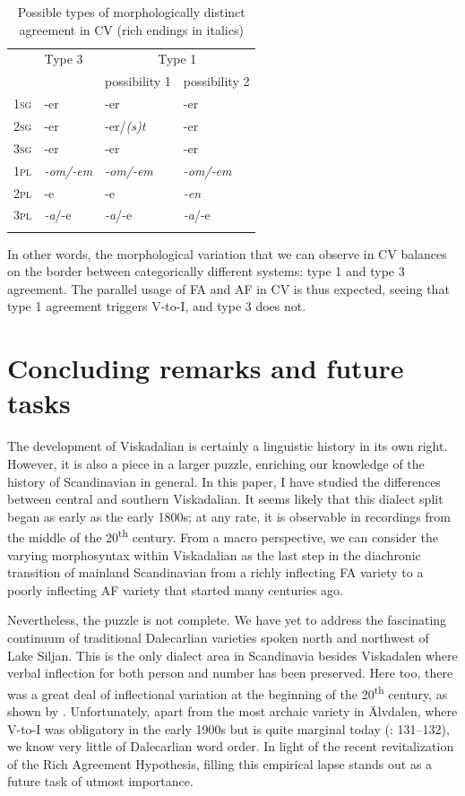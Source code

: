 \documentclass[output=paper,colorlinks,citecolor=brown,draft,draftmode]{langscibook}
\begin{document}
\begin{table}
\caption{Possible types of morphologically distinct agreement in CV (rich endings in italics)\label{tab:petzell:4}}
\begin{tabular}{>{\scshape}llll}
\lsptoprule
& Type 3 & \multicolumn{2}{c}{Type 1}\\\cmidrule(lr){3-4}
&  & possibility 1 & possibility 2\\
\midrule
1sg & -er & -er & -er\\
2sg & -er & -er/\textit{(s)t} & -er\\
3sg & -er & -er & -er\\
1pl & \textit{-om/-em} & \textit{-om/-em} & \textit{-om/-em}\\
2pl & -e & -e & \textit{-en}\\
3pl & \textit{-a}/-e & \textit{-a}/-e & \textit{-a}/-e\\
\lspbottomrule
\end{tabular}
\end{table}

In other words, the morphological variation that we can observe in CV balances on the border between categorically different systems: type 1 and type 3 agreement. The parallel usage of FA and AF in CV is thus expected, seeing that type 1 agreement triggers V-to-I, and type 3 does not.


\section{Concluding remarks and future tasks}\label{sec:petzell:6}


The development of Viskadalian is certainly a linguistic history in its own right. However, it is also a piece in a larger puzzle, enriching our knowledge of the history of Scandinavian in general. In this paper, I have studied the differences between central and southern Viskadalian. It seems likely that this dialect split began as early as the early 1800s; at any rate, it is observable in recordings from the middle of the 20\textsuperscript{th} century. From a macro perspective, we can consider the varying morphosyntax within Viskadalian as the last step in the diachronic transition of mainland Scandinavian from a richly inflecting FA variety to a poorly inflecting AF variety that started many centuries ago. 



Nevertheless, the puzzle is not complete. We have yet to address the fascinating continuum of traditional Dalecarlian varieties spoken north and northwest of Lake Siljan. This is the only dialect area in Scandinavia besides Viskadalen where verbal inflection for both person and number has been preserved. Here too, there was a great deal of inflectional variation at the beginning of the 20\textsuperscript{th} century, as shown by \citet[163--165]{Levander1928}. Unfortunately, apart from the most archaic variety in Älvdalen, where V-to-I was obligatory in the early 1900s \citep[124]{Levander1909} but is quite marginal today (\citealt{Garbacz2010}: 131–132), we know very little of Dalecarlian word order. In light of the recent revitalization of the Rich Agreement Hypothesis, filling this empirical lapse stands out as a future task of utmost importance.
\end{document}
